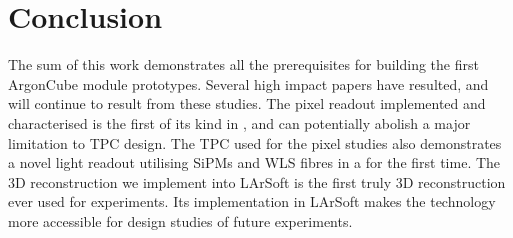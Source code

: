\chapter{Conclusion}
\label{chap:conclusion}


The sum of this work demonstrates all the prerequisites for building the first ArgonCube module prototypes.
Several high impact papers have resulted, and will continue to result from these studies.
The pixel readout implemented and characterised is the first of its kind in \lar{}, and can potentially abolish a major limitation to TPC design.
The TPC used for the pixel studies also demonstrates a novel light readout utilising SiPMs and WLS fibres in a \lartpc{} for the first time.
The 3D reconstruction we implement into LArSoft is the first truly 3D reconstruction ever used for \lar{} experiments.
Its implementation in LArSoft makes the technology more accessible for design studies of future experiments.